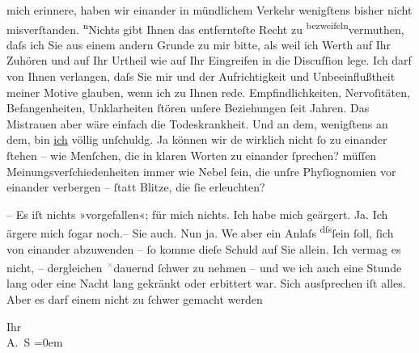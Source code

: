                mich erinnere, haben wir einander in mündlichem Verkehr wenigſtens bisher nicht
               misverſtanden. \substVorne{}\textsuperscript{n}\substDazwischen{}N\substHinten{}ichts gibt Ihnen das
               entfernteſte Recht zu \substVorne{}\textsuperscript{bezweifeln}{\allowbreak}\substDazwischen{}vermuthen\substHinten{}, daſs ich Sie aus einem andern {\pb}Grunde zu mir bitte, als weil ich Werth auf Ihr Zuhören und auf Ihr Urtheil wie auf
               Ihr Eingreifen in die Discuſſion lege. Ich darf von Ihnen verlangen, daſs Sie mir und
               der Aufrichtigkeit \introOben{}und Unbeeinflußtheit\introOben{} meiner Motive
               glauben, wenn ich zu Ihnen rede. Empfindlichkeiten, Nervoſitäten, Befan{\pb}genheiten, Unklarheiten ſtören unſere
               Beziehungen ſeit Jahren. Das Mistrauen aber wäre einfach die Todeskrankheit. Und an
               dem, wenigſtens an dem, bin \uline{ich} völlig unſchuldg. Ja
               können wir de{\geminationn} wirklich nicht ſo zu einander ſtehen –
               wie Menſchen, die in klaren Worten zu einander ſprechen? {\pb}müſſen Meinungsverſchiedenheiten immer wie
               Nebel ſein, die unſre Phyſiognomien vor einander verbergen – ſtatt Blitze, die ſie
               erleuchten?\pend
           
\pstart
           – Es iſt nichts »vorgefallen«; für mich nichts. Ich habe mich geärgert.
               Ja. Ich ärgere mich ſogar noch.– Sie auch. Nun ja. We{\geminationn}
               aber ein Anlaſs \substVorne{}\textsuperscript{dſs}\substDazwischen{}ſein ſoll\substHinten{}, ſich von einander abzu{\pb}wenden – ſo
               komme dieſe Schuld auf Sie allein. Ich vermag es nicht, – dergleichen \substVorne{}\textsuperscript{\textcolor{gray}{×}}\substDazwischen{}dauernd\substHinten{} ſchwer zu nehmen – und we{\geminationn} ich auch \strikeout{\textcolor{gray}{×}\-\textcolor{gray}{×}\-\textcolor{gray}{×}\-\textcolor{gray}{×}\-\textcolor{gray}{×}\-\textcolor{gray}{×}\-\textcolor{gray}{×}\-\textcolor{gray}{×}\-\textcolor{gray}{×}}{ }\strikeout{\textcolor{gray}{und}} eine Stunde lang oder eine Nacht lang gekränkt oder erbittert war. Sich
               ausſprechen iſt alles. Aber es darf einem nicht {\pb}zu ſchwer gemacht werden\pend
           
\pstart
           Ihr {\\[\baselineskip]}\spacefill\mbox{A. S}\pend
           \leftskip=0em{}\endnumbering{}  
      